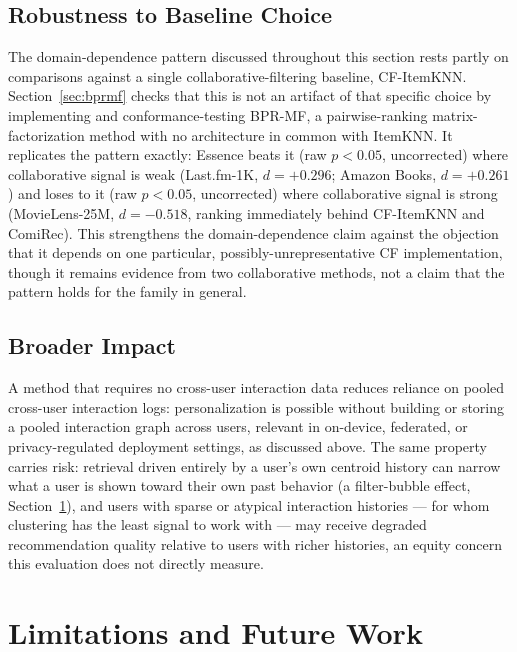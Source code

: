 \documentclass[11pt,a4paper]{article}
\begin{document}
\subsection{Robustness to Baseline Choice}

The domain-dependence pattern discussed throughout this section rests
partly on comparisons against a single collaborative-filtering
baseline, CF-ItemKNN. Section~\ref{sec:bprmf} checks that this is not
an artifact of that specific choice by implementing and
conformance-testing BPR-MF, a pairwise-ranking matrix-factorization
method with no architecture in common with ItemKNN. It replicates the
pattern exactly: Essence beats it (raw $p<0.05$, uncorrected) where
collaborative signal is weak (Last.fm-1K, $d=+0.296$; Amazon Books,
$d=+0.261$) and loses to it (raw $p<0.05$, uncorrected) where
collaborative signal is strong (MovieLens-25M, $d=-0.518$, ranking
immediately behind CF-ItemKNN and ComiRec). This strengthens the domain-dependence claim against the
objection that it depends on one particular, possibly-unrepresentative
CF implementation, though it remains evidence from two collaborative
methods, not a claim that the pattern holds for the family in general.

\subsection{Broader Impact}

A method that requires no cross-user interaction data reduces reliance
on pooled cross-user interaction logs: personalization is possible
without building or storing a pooled interaction graph across users,
relevant in on-device, federated, or privacy-regulated deployment
settings, as discussed above. The same property carries risk: retrieval driven
entirely by a user's own centroid history can narrow what a user is
shown toward their own past behavior (a filter-bubble effect,
Section~\ref{sec:limitations}), and users with sparse or atypical
interaction histories --- for whom clustering has the least signal to
work with --- may receive degraded recommendation quality relative to
users with richer histories, an equity concern this evaluation does not
directly measure.

\section{Limitations and Future Work}
\label{sec:limitations}
\end{document}

